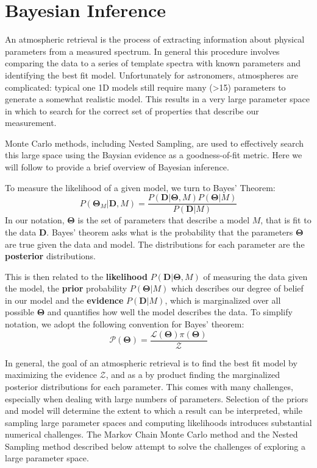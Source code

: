 \section{Bayesian Inference}
An atmospheric retrieval is the process of extracting information about physical parameters from a measured spectrum. 
In general this procedure involves comparing the data to a series of template spectra with known parameters and identifying the best fit model.
Unfortunately for astronomers, atmospheres are complicated: typical one 1D models still require many (>15) parameters to generate a somewhat realistic model. 
This results in a very large parameter space in which to search for the correct set of properties that describe our measurement.

Monte Carlo methods, including Nested Sampling, are used to effectively search this large space using the Baysian evidence as a goodness-of-fit metric.
Here we will follow \parencite{Speagle2019} to provide a brief overview of Bayesian inference.

To measure the likelihood of a given model, we turn to Bayes' Theorem:
\begin{equation}\label{eqn:bayes}
P(\mathbf{\Theta}_{M}|\mathbf{D},M) = \frac{P(\mathbf{D}|\mathbf{\Theta},M)P(\mathbf{\Theta}|M)}{P(\mathbf{D}|M)}
\end{equation}
In our notation, $\mathbf{\Theta}$ is the set of parameters that describe a model $M$, that is fit to the data $\mathbf{D}$. 
Bayes' theorem asks what is the probability that the parameters $\mathbf{\Theta}$ are true given the data and model. 
The distributions for each parameter are the \textbf{posterior} distributions.

This is then related to the \textbf{likelihood} $P(\mathbf{D}|\mathbf{\Theta},M)$ of measuring the data given the model, the \textbf{prior} probability $P(\mathbf{\Theta}|M)$ which describes our degree of belief in our model and the \textbf{evidence} $P(\mathbf{D}|M)$, which is marginalized over all possible $\mathbf{\Theta}$ and quantifies how well the model describes the data.
To simplify notation, we adopt the following convention for Bayes' theorem:
\begin{equation}
\mathcal{P}(\mathbf{\Theta}) = \frac{\mathcal{L}(\mathbf{\Theta})\pi(\mathbf{\Theta})}{\mathcal{Z}}
\end{equation}

In general, the goal of an atmospheric retrieval is to find the best fit model by maximizing the evidence $\mathcal{Z}$, and as a by product finding the marginalized posterior distributions for each parameter.
This comes with many challenges, especially when dealing with large numbers of parameters.
Selection of the priors and model will determine the extent to which a result can be interpreted, while sampling large parameter spaces and computing likelihoods introduces substantial numerical challenges. 
The Markov Chain Monte Carlo method and the Nested Sampling method described below attempt to solve the challenges of exploring a large parameter space.
